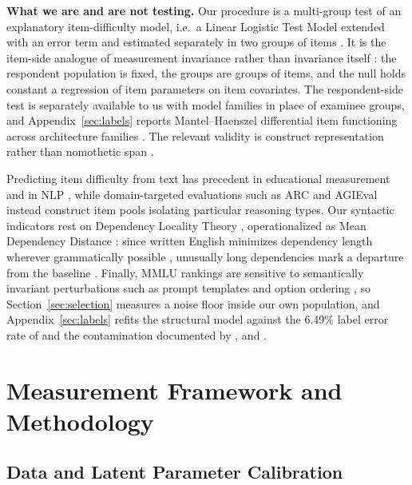 \textbf{What we are and are not testing.} Our procedure is a multi-group test of an explanatory item-difficulty model, i.e.~a Linear Logistic Test Model \citep{fischer1973} extended with an error term and estimated separately in two groups of items \citep{deboeck2004}. It is the item-side analogue of measurement invariance rather than invariance itself \citep{meredith1993,vandenberg2000}: the respondent population is fixed, the groups are groups of items, and the null holds constant a regression of item parameters on item covariates. The respondent-side test is separately available to us with model families in place of examinee groups, and Appendix~\ref{sec:labels} reports Mantel--Haenszel differential item functioning across architecture families \citep{holland1988,dorans1993}. The relevant validity is construct representation rather than nomothetic span \citep{embretson1983}.

Predicting item difficulty from text has precedent in educational measurement \citep{embretson1987} and in NLP \citep{vania2021}, while domain-targeted evaluations such as ARC \citep{clark2018} and AGIEval \citep{zhong2023} instead construct item pools isolating particular reasoning types. Our syntactic indicators rest on Dependency Locality Theory \citep{gibson1998,demberg2008}, operationalized as Mean Dependency Distance \citep{liu2008}: since written English minimizes dependency length wherever grammatically possible \citep{temperley2007,gildea2015}, unusually long dependencies mark a departure from the baseline \citep[cf.][]{levy2008}. Finally, MMLU rankings are sensitive to semantically invariant perturbations such as prompt templates and option ordering \citep{alzahrani2024,pezeshkpour2024,zheng2024,mizrahi2024}, so Section~\ref{sec:selection} measures a noise floor inside our own population, and Appendix~\ref{sec:labels} refits the structural model against the 6.49\% label error rate of \citet{gema2025} and the contamination documented by \citet{sainz2023}, \citet{golchin2024} and \citet{deng2024}.

\section{Measurement Framework and Methodology}\label{measurement-framework-and-methodology}

\subsection{Data and Latent Parameter Calibration}\label{latent-parameter-calibration-via-item-response-theory}

